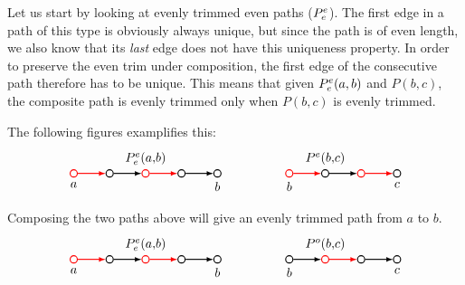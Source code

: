 Let us start by looking at evenly trimmed even paths ($P^e_e$).
The first edge in a path of this type is obviously always unique, but since the path is of even length, we also know that its \textit{last} edge does not have this uniqueness property. In order to preserve the even trim under composition, the first edge of the consecutive path therefore has to be unique.
This means that given $P^e_e(a,b)$ and $P(b,c)$, the composite path is evenly trimmed only when $P(b,c)$ is evenly trimmed.

The following figures examplifies this:
\[
  \begin{tikzpicture}
    [
    point/.style={thick,circle,draw,inner sep=0pt,minimum size=2mm},
    trimmed/.style={thick,draw=red},
    untrimmed/.style={thick,draw=black}
    ]
    \node (0) at (0,0) [point,trimmed,label=below:$a$] {};
    \node (1) at (1,0) [point] {};
    \node (2) at (2,0) [point,trimmed,label=above:$\pee(a{,}b)$] {};
    \node (3) at (3,0) [point] {};
    \node (4) at (4,0) [point,label=below:$b$] {};
    \node (5) at (6,0) [point,trimmed,label=below:$b$] {};
    \node (6) at (7,0) [point,label=above:$P^e(b{,}c)$] {};
    \node (7) at (8,0) [point,trimmed] {};
    \node (8) at (9,0) [point,label=below:$c$] {};
    \draw [-latex,trimmed] (0) to (1);
    \draw [-latex,untrimmed] (1) to (2);
    \draw [-latex,trimmed] (2) to (3);
    \draw [-latex,untrimmed] (3) to (4);
    \draw [-latex,trimmed] (5) to (6);
    \draw [-latex,untrimmed] (6) to (7);
    \draw [-latex,trimmed] (7) to (8);
  \end{tikzpicture}
\]

Composing the two paths above will give an evenly trimmed path from $a$ to $b$.
\[
  \begin{tikzpicture}
    [
    point/.style={thick,circle,draw,inner sep=0pt,minimum size=2mm},
    trimmed/.style={thick,draw=red},
    untrimmed/.style={thick,draw=black}
    ]
    \node (0) at (0,0) [point,trimmed,label=below:$a$] {};
    \node (1) at (1,0) [point] {};
    \node (2) at (2,0) [point,trimmed,label=above:$\pee(a{,}b)$] {};
    \node (3) at (3,0) [point] {};
    \node (4) at (4,0) [point,label=below:$b$] {};
    \node (5) at (6,0) [point,label=below:$b$] {};
    \node (6) at (7,0) [point,trimmed,label=above:$P^o(b{,}c)$] {};
    \node (7) at (8,0) [point] {};
    \node (8) at (9,0) [point,label=below:$c$] {};
    \draw [-latex,trimmed] (0) to (1);
    \draw [-latex,untrimmed] (1) to (2);
    \draw [-latex,trimmed] (2) to (3);
    \draw [-latex,untrimmed] (3) to (4);
    \draw [-latex,untrimmed] (5) to (6);
    \draw [-latex,trimmed] (6) to (7);
    \draw [-latex,untrimmed] (7) to (8);
  \end{tikzpicture}
\]

